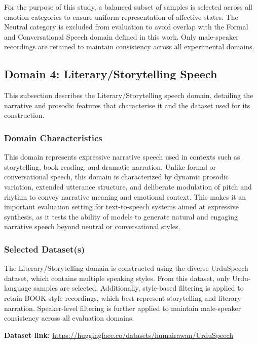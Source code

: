 \documentclass[a4paper,fleqn]{cas-dc}
\begin{document}
    \indent For the purpose of this study, a balanced subset of samples is selected across all emotion categories to ensure uniform representation of affective states. The Neutral category is excluded from evaluation to avoid overlap with the Formal and Conversational Speech domain defined in this work. Only male-speaker recordings are retained to maintain consistency across all experimental domains.
    
    
    \subsection{Domain 4: Literary/Storytelling Speech}\label{sec:domain-literary}

    This subsection describes the Literary/Storytelling speech domain, detailing the narrative and prosodic features that characterise it and the dataset used for its construction.

    \subsubsection{Domain Characteristics}
    \indent This domain represents expressive narrative speech used in contexts such as storytelling, book reading, and dramatic narration. Unlike formal or conversational speech, this domain is characterized by dynamic prosodic variation, extended utterance structure, and deliberate modulation of pitch and rhythm to convey narrative meaning and emotional context. This makes it an important evaluation setting for text-to-speech systems aimed at expressive synthesis, as it tests the ability of models to generate natural and engaging narrative speech beyond neutral or conversational styles.
    
    \subsubsection{Selected Dataset(s)}
    \indent The Literary/Storytelling domain is constructed using the diverse UrduSpeech dataset, which contains multiple speaking styles. From this dataset, only Urdu-language samples are selected. Additionally, style-based filtering is applied to retain BOOK-style recordings, which best represent storytelling and literary narration. Speaker-level filtering is further applied to maintain male-speaker consistency across all evaluation domains.
    
    \noindent \textbf{Dataset link:} \url{https://huggingface.co/datasets/humairawan/UrduSpeech}
    
\end{document}
